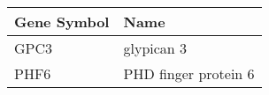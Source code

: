 \begin{tabular}{ll}
\toprule
Gene Symbol &                 Name \\
\midrule
       GPC3 &           glypican 3 \\
       PHF6 & PHD finger protein 6 \\
\bottomrule
\end{tabular}
